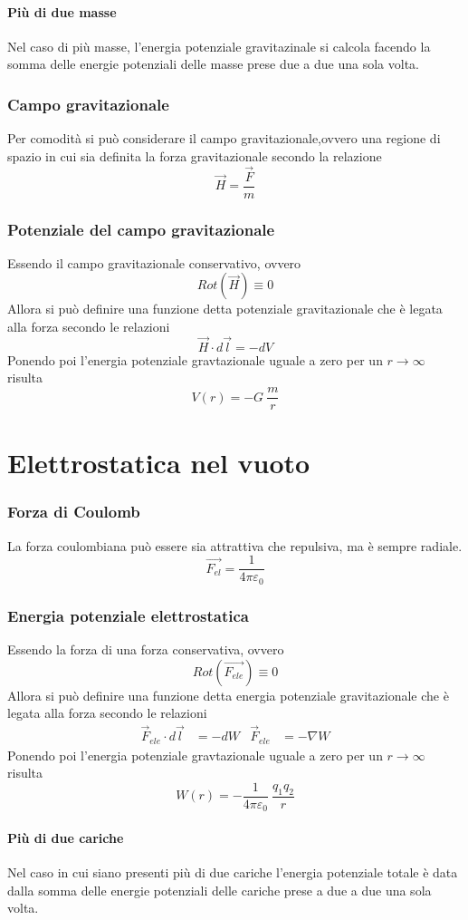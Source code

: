 \documentclass[12pt,a4paper]{report}
\begin{document}
		\subsubsection{Più di due masse}
Nel caso di più masse, l'energia potenziale gravitazinale si calcola facendo la somma delle energie potenziali delle masse prese due a due una sola volta.
	\subsection{Campo gravitazionale}
Per comodità si può considerare il campo gravitazionale,ovvero una regione di spazio in cui sia definita la forza gravitazionale secondo la relazione 
	\[\vec{H}= \frac{\vec{F}}{m}\]
	\subsection{Potenziale del campo gravitazionale}
Essendo il campo gravitazionale conservativo, ovvero
		\[Rot(\vec{H})\equiv 0\]
Allora si può definire una funzione detta potenziale gravitazionale che è legata alla forza secondo le relazioni
		\[\vec{H} \cdot d\vec{l} = -dV \]
Ponendo poi l'energia potenziale gravtazionale uguale a zero per un $r \rightarrow \infty $ risulta
		\[V(r) =-G ~ \frac{m}{r} \] 
\chapter{Elettrostatica nel vuoto}
	\subsection{Forza di Coulomb}
La forza coulombiana può essere sia attrattiva che repulsiva, ma è sempre radiale.
	\[\vec{F_{el}}= \frac{1}{4\pi\varepsilon_{0}}\]
	\subsection{Energia potenziale elettrostatica}
Essendo la forza di  una forza conservativa, ovvero
		\[Rot(\vec{F_{ele}})\equiv 0\]
Allora si può definire una funzione detta energia potenziale gravitazionale che è legata alla forza secondo le relazioni
	\begin{align*}
		\vec{F}_{ele} \cdot d\vec{l} &= -dW  & \vec{F}_{ele} &= - \nabla W
	\end{align*}
Ponendo poi l'energia potenziale gravtazionale uguale a zero per un $r \rightarrow \infty $ risulta
		\[W(r)=-\frac{1}{4 \pi \varepsilon_{0}}~\frac{q_{1}q_{2}}{r}\] 
		\subsubsection{Più di due cariche}
Nel caso in cui siano presenti più di due cariche l'energia potenziale totale è data dalla somma delle energie potenziali delle cariche prese a due a due una sola volta.
\end{document}
